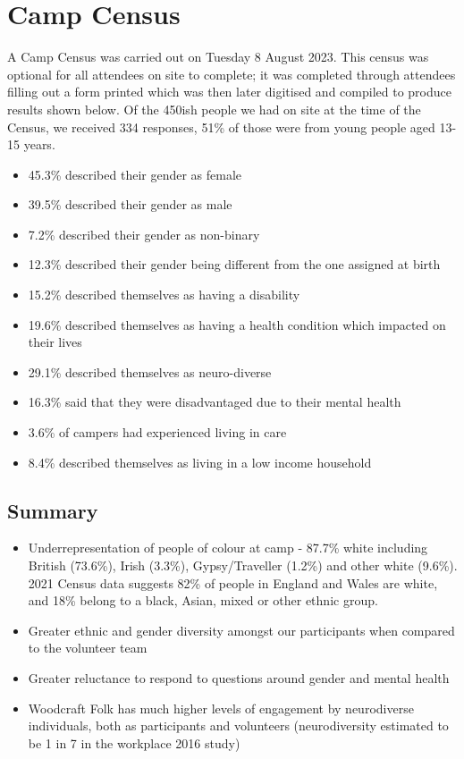 \chapter{Camp Census}
A Camp Census was carried out on Tuesday 8 August 2023. This census was optional for all attendees on site to complete; it was completed through attendees filling out a form printed which was then later digitised and compiled to produce results shown below. Of the 450ish people we had on site at the time of the Census, we received 334 responses, 51\% of those were from young people aged 13-15 years.

\begin{itemize}
    \item 45.3\% described their gender as female
    \item 39.5\% described their gender as male
    \item 7.2\% described their gender as non-binary
    \item 12.3\% described their gender being different from the one assigned at birth
    \item 15.2\% described themselves as having a disability
    \item 19.6\% described themselves as having a health condition which impacted on their lives
    \item 29.1\% described themselves as neuro-diverse
    \item 16.3\% said that they were disadvantaged due to their mental health
    \item 3.6\% of campers had experienced living in care
    \item 8.4\% described themselves as living in a low income household
\end{itemize}

\section{Summary}
\begin{itemize}
    \item Underrepresentation of people of colour at camp - 87.7\% white including British (73.6\%), Irish (3.3\%), Gypsy/Traveller (1.2\%) and other white (9.6\%). 2021 Census data suggests 82\% of people in England and Wales are white, and 18\% belong to a black, Asian, mixed or other ethnic group.
    \item Greater ethnic and gender diversity amongst our participants when compared to the volunteer team
    \item Greater reluctance to respond to questions around gender and mental health
    \item Woodcraft Folk has much higher levels of engagement by neurodiverse individuals, both as participants and volunteers (neurodiversity estimated to be 1 in 7 in the workplace 2016 study)
\end{itemize}


